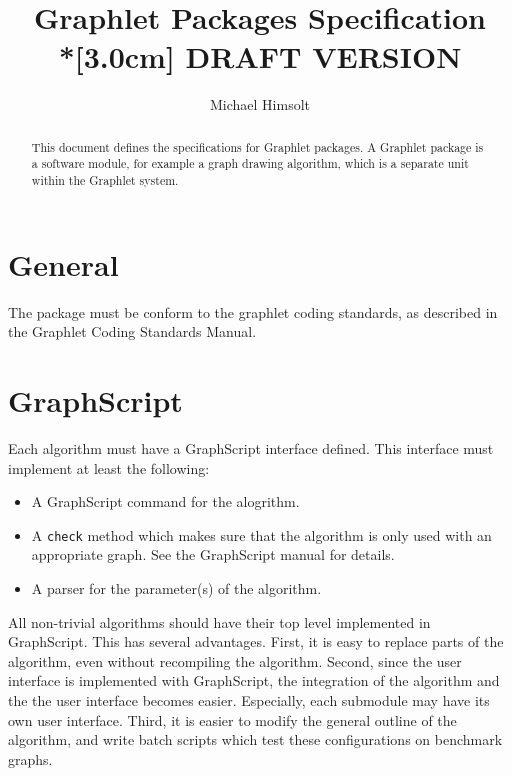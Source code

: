 \documentclass[notitlepage,twoside,fleqn]{article}
\begin{document}
%
%



\title{
  Graphlet Packages Specification
  \\*[3.0cm]
  {\textbf{DRAFT VERSION}}
  }

\author{Michael Himsolt}

\maketitle

\begin{abstract}
  This document defines the specifications for Graphlet packages.
  A Graphlet package is a software module, for example a graph
  drawing algorithm, which is a separate unit within the Graphlet
  system.
\end{abstract}

\tableofcontents


\section{General}

The package must be conform to the graphlet coding standards, as
described in the Graphlet Coding Standards Manual.


\section{GraphScript}

Each algorithm must have a GraphScript interface defined. This
interface must implement at least the following:

\begin{itemize}
  \item A GraphScript command for the alogrithm.
  \item A \texttt{check} method which makes sure that the
  algorithm is only used with an appropriate graph. See the
  GraphScript manual for details.
  \item A parser for the parameter(s) of the algorithm.
\end{itemize}

All non-trivial algorithms should have their top level
implemented in GraphScript. This has several advantages. First,
it is easy to replace parts of the algorithm, even without
recompiling the algorithm. Second, since the user interface is
implemented with GraphScript, the integration of the algorithm
and the the user interface becomes easier. Especially, each
submodule may have its own user interface. Third, it is easier to
modify the general outline of the algorithm, and write batch
scripts which test these configurations on benchmark graphs.
\end{document}
